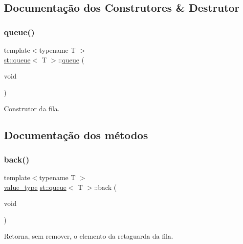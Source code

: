 \subsection{Documentação dos Construtores \& Destrutor}
\mbox{\label{classst_1_1queue_a7f06fb829d7ac4a8d6bd1a0dcb13749a}} 
\subsubsection{\texorpdfstring{queue()}{queue()}}
{\footnotesize\ttfamily template$<$typename T $>$ \\
\hyperlink{classst_1_1queue}{st\+::queue}$<$ T $>$\+::\hyperlink{classst_1_1queue}{queue} (\begin{DoxyParamCaption}\item[{void}]{ }\end{DoxyParamCaption})\hspace{0.3cm}{\ttfamily [inline]}}



Construtor da fila. 



\subsection{Documentação dos métodos}
\mbox{\label{classst_1_1queue_a84bb56aa5f5cecc6a42cac6977cc97c1}} 
\subsubsection{\texorpdfstring{back()}{back()}}
{\footnotesize\ttfamily template$<$typename T $>$ \\
\hyperlink{classst_1_1queue_a2a0fa1d9b72bfdad9acf67a92146b143}{value\+\_\+type} \hyperlink{classst_1_1queue}{st\+::queue}$<$ T $>$\+::back (\begin{DoxyParamCaption}\item[{void}]{ }\end{DoxyParamCaption})\hspace{0.3cm}{\ttfamily [inline]}}



Retorna, sem remover, o elemento da retaguarda da fila. 

\mbox{\label{classst_1_1queue_a5d495f353753608cd37833d79c4f297e}} 
